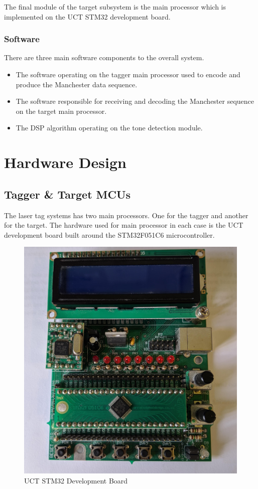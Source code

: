 The final module of the target subsystem is the main processor which is implemented on the UCT STM32 development board.

\subsubsection{Software}

There are three main software components to the overall system.
\begin{itemize}
	\item The software operating on the tagger main processor used to encode and produce the Manchester data sequence.
	\item The software responsible for receiving and decoding the Manchester sequence on the target main processor.
	\item  The DSP algorithm operating on the tone detection module.
\end{itemize}



\section{Hardware Design}

\subsection{Tagger \& Target MCUs}
The laser tag systems has two main processors. One for the tagger and another for the target. The hardware used for main processor in each case is the UCT development board built around the STM32F051C6 microcontroller.

\begin{figure}[H]
	\centering
	\includegraphics[width=.5\textwidth]{figures/design/dev_board_image.jpg}
	\caption{UCT STM32 Development Board}
	\label{fig:stm32_dev_board}
\end{figure}

